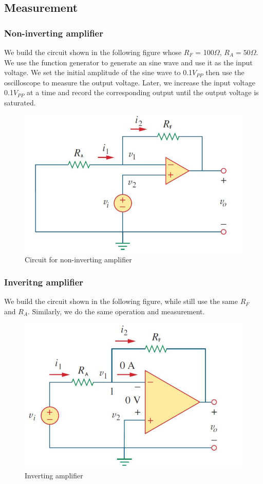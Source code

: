 \documentclass[12pt,a4paper]{article}
\begin{document}
\subsection{Measurement}
\subsubsection{Non-inverting amplifier}
We build the circuit shown in the following figure whose $R_F$ = 100$\Omega $, $R_A = 50\Omega $. We use the function generator to generate an sine wave and use it as the input voltage. We set the initial amplitude of the sine wave to 0.1$V_{PP}$ then use the oscilloscope to measure the output voltage. Later, we increase the input voltage 0.1$V_{PP}$ at a time and record the corresponding output until the output voltage is saturated.
  \begin{figure}[H]
  \centering
  \includegraphics[width=.6\textwidth]{Figure6.jpg}
  \caption{Circuit for non-inverting amplifier}
  \label{img} 
\end{figure}
\subsubsection{Inveritng amplifier}
We build the circuit shown in the following figure, while still use the same $R_F$ and $R_A$. Similarly, we do the same operation and measurement.
  \begin{figure}[H]
  \centering
  \includegraphics[width=.6\textwidth]{Figure7.jpg}
  \caption{Inverting amplifier}
  \label{img} 
\end{figure}
\end{document}
